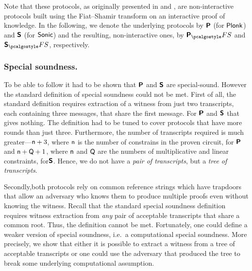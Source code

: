 \let\accentvec\vec \documentclass[runningheads,10pt]{llncs}
\begin{document}
Note that these protocols, as originally presented in
\cite{EPRINT:GabWilCio19} and \cite{CCS:MBKM19}, are non-interactive protocols
built using the Fiat--Shamir transform on an interactive proof of knowledge.
In the following, we denote the underlying protocols by $\bm{\mathsf{P}}$ (for
$\textnormal{\textsf{Plonk}}$) and $\bm{\mathsf{S}}$ (for ${\textnormal{\textsf{Sonic}}}$) and the resulting, non-interactive
ones, by $\plonkprotfs$ and $\sonicprotfs$, respectively. 

\subsubsection{Special soundness.} 
To be able to follow \cite{INDOCRYPT:FKMV12} it had to be shown that
$\bm{\mathsf{P}}$ and $\bm{\mathsf{S}}$ are special-sound.  However the standard definition of special
soundness could not be met.  First of
all, the standard definition requires extraction of a witness from just two
transcripts, each containing three messages, that share the first message. For
$\bm{\mathsf{P}}$ and $\bm{\mathsf{S}}$ that gives nothing. The definition had to be tuned to cover
protocols that have more rounds than just three.  Furthermore, the number of
transcripts required is much greater---$\mathsf{n} + 3$, where
$\mathsf{n}$ is the number of constrains in the proven circuit, for
$\bm{\mathsf{P}}$ and $\mathsf{n} + \mathsf{Q} + 1$, where $\mathsf{n}$ and
$\mathsf{Q}$ are the numbers of multiplicative and linear constraints,
for$\bm{\mathsf{S}}$. Hence, we do not have a \emph{pair of transcripts}, but a \emph{tree of transcripts}.

Secondly,both protocols rely on common reference strings which have trapdoors
that allow an adversary who knows them to
produce multiple proofs even without knowing the witness. Recall that the
standard special soundness definition requires witness extraction from
\emph{any} pair of acceptable transcripts that share a common root. Thus, the
definition cannot be met. Fortunately, one could define a weaker version of special
soundness, i.e.~a computational special soundness. More precisely, we show that
either it is possible to extract a witness from a tree of acceptable transcripts
or one could use the adversary that produced the tree to break some underlying
computational assumption.

\end{document}
